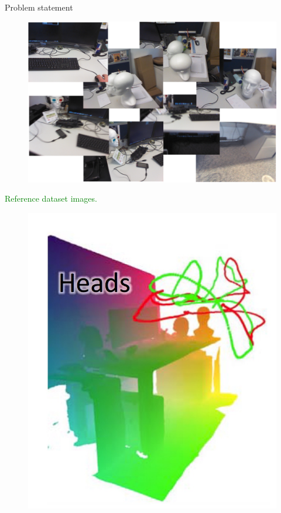 \begin{frame}{Problem statement}
\begin{minipage}{0.47\linewidth}
		\begin{figure}
			\includegraphics[width=0.7\linewidth]{images/intro/patchwork/patchwork}
		\end{figure}	
		\textcolor<2>{green}{Reference dataset images.}
	\end{minipage}\hfill
	\begin{minipage}{0.5\linewidth}
		\centering
		{
		\begin{figure}
			\includegraphics[width=0.6\linewidth]{images/intro/heads}
		\end{figure}	
		}	
		
		\vfill		
		
	\end{minipage}
	
\end{frame}

